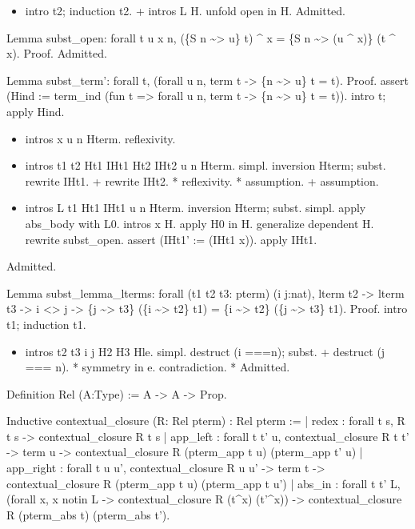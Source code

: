 \begin{itemize}
\item  intro t2; induction t2.
    + intros L H.
      unfold open in H.
      Admitted.

\end{itemize}


Lemma subst\_open: forall t u x n,  (\{S n \~{}> u\} t) \^{} x = \{S n \~{}> (u \^{} x)\} (t \^{} x). 
Proof.
  Admitted.


Lemma subst\_term': forall t, (forall u n, term t -> \{n \~{}> u\} t = t).
Proof.
  assert (Hind := term\_ind (fun t => forall u n, term t -> \{n \~{}> u\} t = t)).
  intro t; apply Hind.

\begin{itemize}
\item  intros x u n Hterm.
    reflexivity.

\item  intros t1 t2 Ht1 IHt1 Ht2 IHt2 u n Hterm.
    simpl.
    inversion Hterm; subst.
    rewrite IHt1.
    + rewrite IHt2.
      * reflexivity.
      * assumption.
    + assumption.

\item  intros L t1 Ht1 IHt1 u n Hterm.
    inversion Hterm; subst.
    simpl.
    apply abs\_body with L0.
    intros x H.
    apply H0 in H.
    generalize dependent H.
    rewrite subst\_open.
    assert (IHt1' := (IHt1 x)).
    apply IHt1.

\end{itemize}
Admitted.


Lemma subst\_lemma\_lterms: forall (t1 t2 t3: pterm) (i j:nat), lterm t2 -> lterm t3 -> i <> j -> \{j \~{}> t3\} (\{i \~{}> t2\} t1) = \{i \~{}> t2\} (\{j \~{}> t3\} t1).
Proof.
  intro t1; induction t1.

\begin{itemize}
\item  intros t2 t3 i j H2 H3 Hle.
    simpl.
    destruct (i ===n); subst.
    + destruct (j === n).
      * symmetry in e.
        contradiction.
      * Admitted.

\end{itemize}








Definition Rel (A:Type) := A -> A -> Prop.


Inductive contextual\_closure (R: Rel pterm) : Rel pterm :=
  | redex : forall t s, R t s -> contextual\_closure R t s
  | app\_left : forall t t' u, contextual\_closure R t t' -> term u ->
	  		      contextual\_closure R (pterm\_app t u) (pterm\_app t' u)
  | app\_right : forall t u u', contextual\_closure R u u' -> term t ->
	  		       contextual\_closure R (pterm\_app t u) (pterm\_app t u')
  | abs\_in : forall t t' L, (forall x, x notin L -> contextual\_closure R (t\^{}x) (t'\^{}x)) ->
                               contextual\_closure R (pterm\_abs t) (pterm\_abs t').


